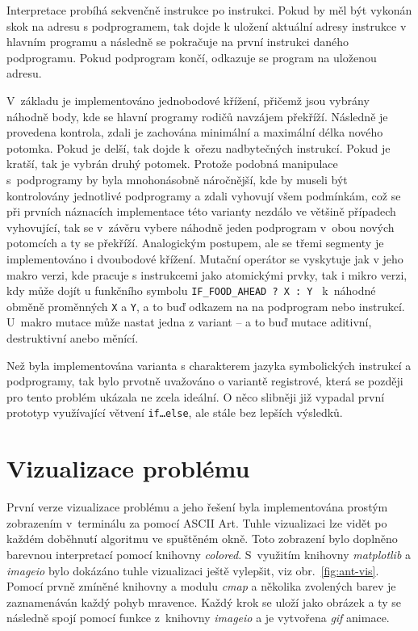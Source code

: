 \noindent Interpretace probíhá sekvenčně instrukce po instrukci. Pokud by měl být vykonán skok na adresu s podprogramem, tak dojde k uložení aktuální adresy instrukce v hlavním programu a následně se pokračuje na první instrukci daného podprogramu. Pokud podprogram končí, odkazuje se program na uloženou adresu.

 V~základu je implementováno jednobodové křížení, přičemž jsou vybrány náhodně body, kde se hlavní programy rodičů navzájem překříží. Následně je provedena kontrola, zdali je zachována minimální a maximální délka nového potomka. Pokud je delší, tak dojde k~ořezu nadbytečných instrukcí. Pokud je kratší, tak je vybrán druhý potomek. Protože podobná manipulace s~podprogramy by byla mnohonásobně náročnější, kde by museli být kontrolovány jednotlivé podprogramy a zdali vyhovují všem podmínkám, což se při prvních náznacích implementace této varianty nezdálo ve většině případech vyhovující, tak se v~závěru vybere náhodně jeden podprogram v~obou nových potomcích a ty se překříží. Analogickým postupem, ale se třemi segmenty je implementováno i dvoubodové křížení.
Mutační operátor se vyskytuje jak v jeho makro verzi, kde pracuje s instrukcemi jako atomickými prvky, tak i mikro verzi, kdy může dojít u funkčního symbolu \texttt{IF\_FOOD\_AHEAD ? X : Y } k~náhodné obměně proměnných \texttt{X} a \texttt{Y}, a to buď odkazem na na podprogram nebo instrukcí. U~makro mutace může nastat jedna z variant -- a to buď mutace aditivní, destruktivní anebo měnící. 

Než byla implementována varianta s charakterem jazyka symbolických instrukcí a podprogramy, tak bylo prvotně uvažováno o variantě registrové, která se později pro tento problém ukázala ne zcela ideální. O něco slibněji již vypadal první prototyp využívající větvení \texttt{if\dots else}, ale stále bez lepších výsledků.

\section{Vizualizace problému}
První verze vizualizace problému a jeho řešení byla implementována prostým zobrazením v~terminálu za pomocí ASCII Art. Tuhle vizualizaci lze vidět po každém doběhnutí algoritmu ve spuštěném okně. Toto zobrazení bylo doplněno barevnou interpretací pomocí knihovny \emph{colored}. S~využitím knihovny \emph{matplotlib} a \emph{imageio} bylo dokázáno tuhle vizualizaci ještě vylepšit, viz obr.~\ref{fig:ant-vis}. Pomocí prvně zmíněné knihovny a modulu \emph{cmap} a několika zvolených barev je zaznamenáván každý pohyb mravence. Každý krok se uloží jako obrázek a ty se následně spojí pomocí funkce z~knihovny \emph{imageio} a je vytvořena \emph{gif} animace.

